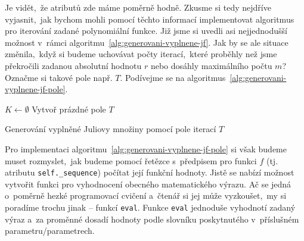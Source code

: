 Je vidět,~že atributů zde máme poměrně hodně. Zkusme si tedy nejdříve vyjasnit,~jak bychom mohli pomocí těchto informací implementovat algoritmus pro iterování zadané polynomiální funkce. Již jsme si uvedli asi nejjednodušší možnost v~rámci algoritmu~\ref{alg:generovani-vyplnene-jf}. Jak by se ale situace změnila,~když si budeme uchovávat počty iterací,~které proběhly než jsme překročili zadanou absolutní hodnotu $r$ nebo dosáhly maximálního počtu $m$? Označme si takové pole např. $T$. Podívejme se na algoritmus~\ref{alg:generovani-vyplnene-jf-pole}.
\begin{algorithm}[h]
    $K\gets\emptyset$\;
    Vytvoř prázdné pole $T$\;
    \;
    \caption{Generování vyplněné Juliovy množiny pomocí pole iterací $T$}
    \label{alg:generovani-vyplnene-jf-pole}
\end{algorithm}
Pro implementaci algoritmu~\ref{alg:generovani-vyplnene-jf-pole} si však budeme muset rozmyslet,~jak budeme pomocí řetězce s~předpisem pro funkci $f$ (tj. atributu \texttt{self.\_sequence}) počítat její funkční hodnoty. Jistě se nabízí možnost vytvořit funkci pro vyhodnocení obecného matematického výrazu. Ač se jedná o~poměrně hezké programovací cvičení a~čtenář si jej může vyzkoušet,~my si poradíme trochu jinak -- funkcí \texttt{eval}. Funkce \texttt{eval} jednoduše vyhodnotí zadaný výraz a~za proměnné dosadí hodnoty podle slovníku poskytnutého v~příslušném parametru/parametrech.

